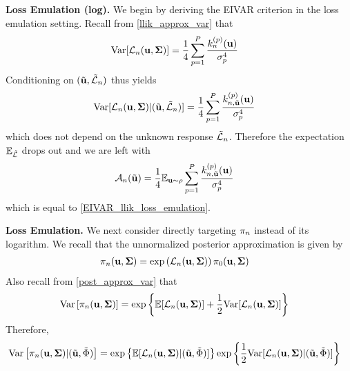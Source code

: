 \documentclass[12pt]{article}
\begin{document}
\bigskip
\noindent
\textbf{Loss Emulation (log).} 
We begin by deriving the EIVAR criterion in the loss emulation setting. Recall from \ref{llik_approx_var} that 
\begin{align*}
\Var[\llik_{\designIdx}(\bpar, \CovObs)] &= \frac{1}{4} \sum_{\objIdx = 1}^{\Nobj} \frac{\GPKerPredOut{\designIdx}{\objIdx}(\bpar)}{\sdObs_{\objIdx}^4}
\end{align*}
Conditioning on $(\tilde{\bpar}, \tilde{\llik}_{\designIdx})$ thus yields 
\begin{align*}
\Var[\llik_{\designIdx}(\bpar, \CovObs) | (\tilde{\bpar}, \tilde{\llik}_{\designIdx})] &= \frac{1}{4} \sum_{\objIdx = 1}^{\Nobj} \frac{\GPKerPredOut{\designIdx, \tilde{\bpar}}{\objIdx}(\bpar)}{\sdObs_{\objIdx}^4}
\end{align*}
which does not depend on the unknown response $\tilde{\llik}_{\designIdx}$. Therefore the expectation $\E_{\tilde{\llik}}$ drops out and we are left with 
\begin{align*}
\acq[\designIdx](\tilde{\bpar}) &= \frac{1}{4} \E_{\bpar \sim \rho} \sum_{\objIdx = 1}^{\Nobj} \frac{\GPKerPredOut{\designIdx, \tilde{\bpar}}{\objIdx}(\bpar)}{\sdObs_{\objIdx}^4}
\end{align*}
which is equal to \ref{EIVAR_llik_loss_emulation}.

\bigskip
\noindent
\textbf{Loss Emulation.}
 We next consider directly targeting $\postDens_{\designIdx}$ instead of its logarithm. We recall that the unnormalized posterior approximation is given 
 by 
 \begin{align*}
 \postDens_{\designIdx}(\bpar, \CovObs) &= \exp\left(\llik_{\designIdx}(\bpar, \CovObs) \right)\priorDens(\bpar, \CovObs)
 \end{align*}
 Also recall from \ref{post_approx_var} that 
 \begin{align*}
 \Var\left[\postDens_{\designIdx}(\bpar, \CovObs)\right] &= \exp\left\{\E[\llik_{\designIdx}(\bpar, \CovObs)] + \frac{1}{2}\Var[\llik_{\designIdx}(\bpar, \CovObs)] \right\}
\end{align*}
Therefore, 
 \begin{align*}
 \Var\left[\postDens_{\designIdx}(\bpar, \CovObs) | (\tilde{\bpar}, \tilde{\SSR})\right] &= \exp\left\{\E[\llik_{\designIdx}(\bpar, \CovObs) | (\tilde{\bpar}, \tilde{\SSR})]\right\} \exp\left\{\frac{1}{2}\Var[\llik_{\designIdx}(\bpar, \CovObs) | (\tilde{\bpar}, \tilde{\SSR})] \right\}
\end{align*}
\end{document}
